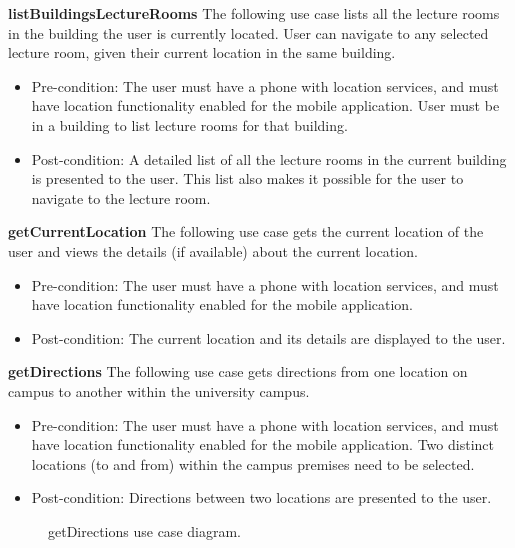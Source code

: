 \documentclass[12pt,a4paper]{article}
\begin{document}
		    \textbf{listBuildingsLectureRooms}
            The following use case lists all the lecture rooms in the building the user is currently located. User can              	        navigate to any selected lecture room, given their current location in the same building.

			\begin{itemize}
			\item Pre-condition: The user must have a phone with location services, and must have location functionality 			              enabled for the mobile application. User must be in a building to list lecture rooms for that building.
			\item Post-condition: A detailed list of all the lecture rooms in the current building is presented to the user. 					  This list also makes it possible for the user to navigate to the lecture room.
			\end{itemize}

		    \textbf{getCurrentLocation}
			The following use case gets the current location of the user and views the details (if available) about the 		            current location.

			\begin{itemize}
			\item Pre-condition: The user must have a phone with location services, and must have location functionality 			              enabled for the mobile application.
			\item Post-condition: The current location and its details are displayed to the user.
			\end{itemize}

	        \textbf{getDirections}
			The following use case gets directions from one location on campus to another within the university campus.

			\begin{itemize}
			\item Pre-condition: The user must have a phone with location services, and must have location functionality 						  enabled for the mobile application. Two distinct locations (to and from) within the campus premises need to        			      be selected.
			\item Post-condition: Directions between two locations are presented to the user.
			\end{itemize}

			\begin{figure}[ht!]
				\caption \newline getDirections use case diagram.
			\end{figure}
\end{document}
